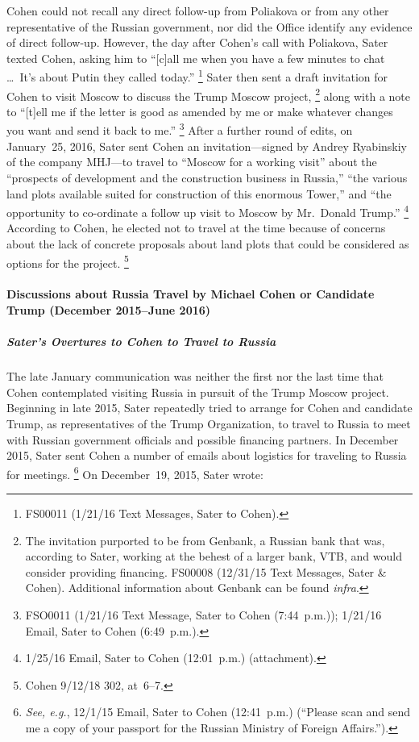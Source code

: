 Cohen could not recall any direct follow-up from Poliakova or from any other representative of the Russian government, nor did the Office identify any evidence of direct follow-up.
However, the day after Cohen's call with Poliakova, Sater texted Cohen, asking him to ``[c]all me when you have a few minutes to chat \dots\ It's about Putin they called today.''%
\footnote{FS00011 (1/21/16 Text Messages, Sater to Cohen).}
Sater then sent a draft invitation for Cohen to visit Moscow to discuss the Trump Moscow project,%
\footnote{The invitation purported to be from Genbank, a Russian bank that was, according to Sater, working at the behest of a larger bank, VTB, and would consider providing financing.
FS00008 (12/31/15 Text Messages, Sater \& Cohen).
Additional information about Genbank can be found \textit{infra}.}
along with a note to ``[t]ell me if the letter is good as amended by me or make whatever changes you want and send it back to me.''%
\footnote{FSO0011 (1/21/16 Text Message, Sater to Cohen (7:44~p.m.));
1/21/16 Email, Sater to Cohen (6:49~p.m.).}
After a further round of edits, on January~25, 2016, Sater sent Cohen an invitation---signed by Andrey Ryabinskiy of the company MHJ---to travel to ``Moscow for a working visit'' about the ``prospects of development and the construction business in Russia,'' ``the various land plots available suited for construction of this enormous Tower,'' and ``the opportunity to co-ordinate a follow up visit to Moscow by Mr.~Donald Trump.''%
\footnote{1/25/16 Email, Sater to Cohen (12:01~p.m.) (attachment).}
According to Cohen, he elected not to travel at the time because of concerns about the lack of concrete proposals about land plots that could be considered as options for the project.%
\footnote{Cohen 9/12/18 302, at~6--7.}

\paragraph{Discussions about Russia Travel by Michael Cohen or Candidate Trump (December 2015--June 2016)}

\subparagraph{Sater's Overtures to Cohen to Travel to Russia}

The late January communication was neither the first nor the last time that Cohen contemplated visiting Russia in pursuit of the Trump Moscow project.
Beginning in late 2015, Sater repeatedly tried to arrange for Cohen and candidate Trump, as representatives of the Trump Organization, to travel to Russia to meet with Russian government officials and possible financing partners.
In December 2015, Sater sent Cohen a number of emails about logistics for traveling to Russia for meetings.%
\footnote{\textit{See, e.g.}, 12/1/15 Email, Sater to Cohen (12:41~p.m.)
(``Please scan and send me a copy of your passport for the Russian Ministry of Foreign Affairs.'').}
On December~19, 2015, Sater wrote:

